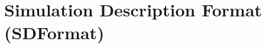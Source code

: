 \section{Simulation Description Format (SDFormat)}
\label{sec:sdformat}

\textcolor{red}{\lipsum[1-2]}
